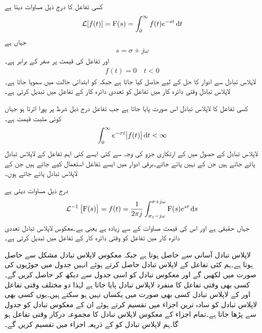
کسی تفاعل  کا  درج ذیل مساوات دیتا ہے
\begin{align}\label{مساوات_لاپلاس_بدل_تعارف}
\Laplace[f(t)]=\bF(s)=\int_0^{\infty} f(t) e^{-st}\dif t
\end{align}
جہاں   ہے
\begin{align}
s=\sigma+j\omega
\end{align}
اور تفاعل  کی قیمت  پر صفر کے برابر ہے۔
\begin{align}
f(t)=0\quad t<0
\end{align}
لاپلاس تبادل سے ادوار کا حل  کے لیے حاصل کیا جاتا ہے جبکہ  کو ابتدائی حالت میں سمویا جاتا ہے۔ لاپلاس تبادل وقتی دائرہ کار میں تفاعل  کو تعددی دائرہ کار کے تفاعل  میں تبدیل کرتی ہے۔ 

کسی تفاعل کا لاپلاس تبادل اس صورت پایا جاتا ہے جب تفاعل درج ذیل شرط پر پورا اترتا ہو جہاں  کوئی مثبت قیمت ہے۔
\begin{align}\label{مساوات_لاپلاس_شرط_بدل_پایا_جاتا_ہے}
\int_0^{\infty} e^{-\sigma t}\abs{f(t)}\dif t<\infty
\end{align}
لاپلاس تبادل کے حصول میں  کے ارتکازی جزو  کی وجہ سے کئی ایسے کئی اہم تفاعل کے لاپلاس تبادل پائے جاتے ہیں جن کے  نہیں پائے جاتے۔برقی ادوار میں ایسے تفاعل استعمال کیے جاتے ہیں جن کے لاپلاس تبادل پائے جاتے ہوں۔

 درج ذیل مساوات دیتی ہے
\begin{align}
\Laplace^{-1}\left[\bF(s)\right]=f(t)=\frac{1}{2\pi j}\int_{\sigma_1-j\omega}^{\sigma+j\omega} \bF(s) e^{st} \dif s
\end{align}
 جہاں  حقیقی ہے اور اس کی قیمت مساوات  کے  سے زیادہ ہے یعنی  ہے۔معکوس لاپلاس تبادل تعددی دائرہ کار میں تفاعل  کو وقتی دائرہ کار کے تفاعل  میں تبدیل کرتی ہے۔

لاپلاس تبادل آسانی سے حاصل ہوتا ہے جبکہ معکوس لاپلاس تبادل مشکل سے حاصل ہوتا ہے۔ہم کئی تفاعل کے لاپلاس تبادل حاصل کرتے ہوئے انہیں جدول میں جوڑیوں کی صورت میں لکھیں گے اور معکوس تبادل کو اسی جدول سے دیکھ کر حاصل کریں گے۔کسی بھی وقتی تفاعل  کا منفرد لاپلاس تبادل  پایا جاتا ہے لہٰذا دو مختلف وقتی تفاعل  اور  کے لاپلاس تبادل کسی بھی صورت میں یکساں نہیں ہو سکتے ہیں۔یوں کسی بھی لاپلاس تبادل  کو سادہ ترین اجزاء میں تقسیم کرتے ہوئے ان کے معکوس تبادل کو جدول سے پڑھا جاتا ہے۔تمام اجزاء کے معکوس لاپلاس تبادل کا مجموعہ درکار وقتی تفاعل ہو گا۔ہم لاپلاس تبادل کو  کے ذریعہ اجزاء میں تقسیم کریں گے۔

